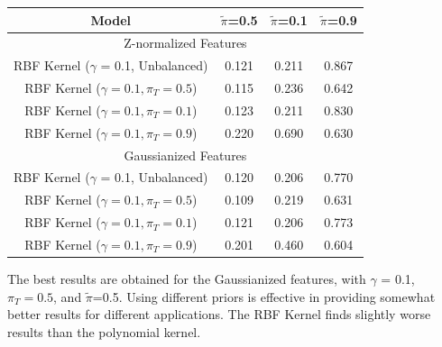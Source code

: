 \documentclass[12pt,a4paper]{article}
\begin{document}
\begin{center}
    \renewcommand{\arraystretch}{1.2}
    \begin{tabular}{@{}cccc@{}}
        Model                                    & \(\tilde{\pi}\)=0.5   & \(\tilde{\pi}\)=0.1   & \(\tilde{\pi}\)=0.9  \\ [0.5ex]

        \hline
        \multicolumn{4}{c}{Z-normalized Features}                                                                       \\
        \hline
        RBF Kernel ($\gamma$ = 0.1, Unbalanced)  & 0.121                 & {\color{blue} 0.211 } & 0.867                \\
        RBF Kernel ($\gamma = 0.1, \pi_T = 0.5$) & {\color{blue} 0.115 } & 0.236                 & 0.642                \\
        RBF Kernel ($\gamma = 0.1, \pi_T = 0.1$) & 0.123                 & {\color{blue} 0.211 } & 0.830                \\
        RBF Kernel ($\gamma = 0.1, \pi_T = 0.9$) & 0.220                 & 0.690                 & 0.630                \\

        \hline
        \multicolumn{4}{c}{Gaussianized Features}                                                                       \\
        \hline
        RBF Kernel ($\gamma$ = 0.1, Unbalanced)  & 0.120                 & {\color{red} 0.206 }  & 0.770                \\
        RBF Kernel ($\gamma = 0.1, \pi_T = 0.5$) & {\color{red} 0.109 }  & 0.219                 & 0.631                \\
        RBF Kernel ($\gamma = 0.1, \pi_T = 0.1$) & 0.121                 & {\color{red} 0.206 }  & 0.773                \\
        RBF Kernel ($\gamma = 0.1, \pi_T = 0.9$) & 0.201                 & 0.460                 & {\color{red} 0.604 } \\
    \end{tabular}
\end{center}

The best results are obtained for the Gaussianized features, with $\gamma$ = 0.1, \(\pi_T = 0.5\), and \(\tilde{\pi}\)=0.5.
Using different priors is effective in providing somewhat better results for different applications.
The RBF Kernel finds slightly worse results than the polynomial kernel.
\end{document}
